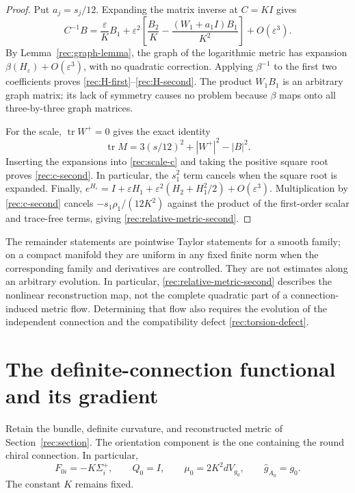 \documentclass[11pt]{article}
\numberwithin{equation}{section}
\theoremstyle{definition}
\theoremstyle{remark}
\begin{document}
\begin{proof}
Put $a_j=s_j/12$.  Expanding the matrix inverse at $C=KI$ gives
\[
 C^{-1}B
  =\frac{\varepsilon}{K}B_1
    +\varepsilon^2\left[
           \frac{B_2}{K}
           -\frac{(W_1+a_1I)B_1}{K^2}\right]
    +O(\varepsilon^3).
\]
By Lemma~\ref{rec:graph-lemma}, the graph of the logarithmic metric
has expansion $\beta(H_\varepsilon)+O(\varepsilon^3)$, with no
quadratic correction.  Applying $\beta^{-1}$ to the first two
coefficients proves \eqref{rec:H-first}--\eqref{rec:H-second}.
The product $W_1B_1$ is an arbitrary graph matrix; its lack of
symmetry causes no problem because $\beta$ maps onto all
three-by-three graph matrices.

For the scale, $\operatorname{tr}W^+=0$ gives the exact identity
\[
 \operatorname{tr}M
     =3(s/12)^2+|W^+|^2-|B|^2.
\]
Inserting the expansions into \eqref{rec:scale-c} and taking the
positive square root proves \eqref{rec:c-second}.  In particular,
the $s_1^2$ term cancels when the square root is expanded.
Finally,
$e^{H_\varepsilon}
 =I+\varepsilon H_1+\varepsilon^2(H_2+H_1^2/2)+O(\varepsilon^3)$.
Multiplication by \eqref{rec:c-second} cancels
$-s_1\rho_1/(12K^2)$ against the product of the first-order scalar
and trace-free terms, giving \eqref{rec:relative-metric-second}.
\end{proof}

The remainder statements are pointwise Taylor statements for a
smooth family; on a compact manifold they are uniform in any fixed
finite norm when the corresponding family and derivatives are
controlled.  They are not estimates along an arbitrary evolution.
In particular, \eqref{rec:relative-metric-second} describes the
nonlinear reconstruction map, not the complete quadratic part of a
connection-induced metric flow.  Determining that flow also requires
the evolution of the independent connection and the compatibility
defect \eqref{rec:torsion-defect}.


\section{The definite-connection functional and its gradient}
\label{sec:definite-flow}

Retain the bundle, definite curvature, and reconstructed metric of Section~\ref{rec:section}. The orientation component is the one containing the round chiral connection. In particular,
\[
F_{0i}=-K\Sigma_i^+,\qquad Q_0=I,\qquad
\mu_0=2K^2dV_{g_0},\qquad \widehat g_{A_0}=g_0.
\]
The constant \(K\) remains fixed.
\end{document}
